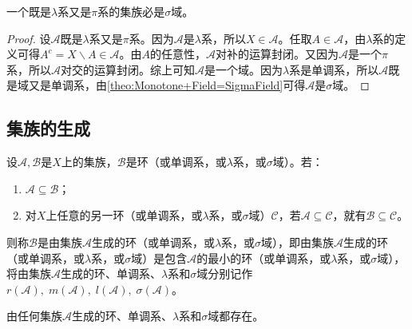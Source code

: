 \begin{theorem}\label{theo:Lambda+Pi=Sigma}
	一个既是$\lambda$系又是$\pi$系的集族必是$\sigma$域。
\end{theorem}
\begin{proof}
	设$\mathscr{A}$既是$\lambda$系又是$\pi$系。因为$\mathscr{A}$是$\lambda$系，所以$X\in\mathscr{A}$。任取$A\in\mathscr{A}$，由$\lambda$系的定义可得$A^c=X\backslash A\in\mathscr{A}$。由$A$的任意性，$\mathscr{A}$对补的运算封闭。又因为$\mathscr{A}$是一个$\pi$系，所以$\mathscr{A}$对交的运算封闭。综上可知$\mathscr{A}$是一个域。因为$\lambda$系是单调系，所以$\mathscr{A}$既是域又是单调系，由\cref{theo:Monotone+Field=SigmaField}可得$\mathscr{A}$是$\sigma$域。
\end{proof}

\subsection{集族的生成}
\begin{definition}
	设$\mathscr{A},\mathscr{B}$是$X$上的集族，$\mathscr{B}$是环（或单调系，或$\lambda$系，或$\sigma$域）。若：
	\begin{enumerate}
		\item $\mathscr{A}\subseteq\mathscr{B}$；
		\item 对$X$上任意的另一环（或单调系，或$\lambda$系，或$\sigma$域）$\mathscr{C}$，若$\mathscr{A}\subseteq\mathscr{C}$，就有$\mathscr{B}\subseteq\mathscr{C}$。
	\end{enumerate}
	则称$\mathscr{B}$是由集族$\mathscr{A}$生成的环（或单调系，或$\lambda$系，或$\sigma$域），即由集族$\mathscr{A}$生成的环（或单调系，或$\lambda$系，或$\sigma$域）是包含$\mathscr{A}$的最小的环（或单调系，或$\lambda$系，或$\sigma$域），将由集族$\mathscr{A}$生成的环、单调系、$\lambda$系和$\sigma$域分别记作$r(\mathscr{A}),\;m(\mathscr{A}),\;l(\mathscr{A}),\;\sigma(\mathscr{A})$。
\end{definition}
\begin{theorem}
	由任何集族$\mathscr{A}$生成的环、单调系、$\lambda$系和$\sigma$域都存在。
\end{theorem}
